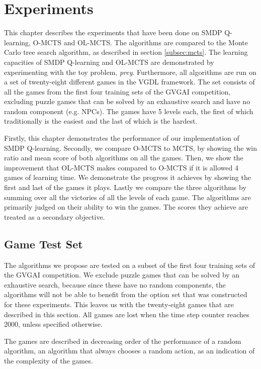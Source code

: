 \chapter{Experiments}
\label{sec:experiments}
This chapter describes the experiments that have been done on SMDP Q-learning,
O-MCTS and OL-MCTS. The algorithms are compared to the Monte Carlo tree search
algorithm, as described in section \ref{subsec:mcts}. The learning capacities of
SMDP Q-learning and OL-MCTS are demonstrated by experimenting with the toy
problem, \textit{prey}. Furthermore, all algorithms are run on a set of
twenty-eight different games in the VGDL framework. The set consists of all the
games from the first four training sets of the GVGAI competition, excluding
puzzle games that can be solved by an exhaustive search and have no random
component (e.g. NPCs). The games have 5 levels each, the first of which
traditionally is the easiest and the last of which is the hardest.

Firstly, this chapter demonstrates the performance of our implementation of SMDP
Q-learning. Secondly, we compare O-MCTS to MCTS, by showing the win ratio and
mean score of both algorithms on all the games. Then, we show the improvement
that OL-MCTS makes compared to O-MCTS if it is allowed 4 games of learning time.
We demonstrate the progress it achieves by showing the first and last of the
games it plays.  Lastly we compare the three algorithms by summing over all the
victories of all the levels of each game.  The algorithms are primarily judged
on their ability to win the games. The scores they achieve are treated as a
secondary objective.

\section{Game Test Set}
\label{subsec:games}
The algorithms we propose are tested on a subset of the first four training sets
of the GVGAI competition. We exclude puzzle games that can be solved by an
exhaustive search, because since these have no random components, the algorithms
will not be able to benefit from the option set that was constructed for these
experiments. This leaves us with the twenty-eight games that are described in
this section. All games are lost when the time step counter reaches 2000, unless
specified otherwise.

The games are described in decreasing order of the performance of a random
algorithm, an algorithm that always chooses a random action, as an indication of
the complexity of the games. 

